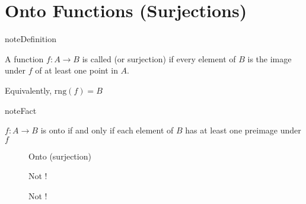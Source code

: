 \documentclass[letterpaper,10pt,english]{jupyterBook}
\begin{document}
\begin{figure}[htbp]
\centering

\noindent{}
\end{figure}


\section{Onto Functions (Surjections)}
\label{\detokenize{03.set_theory:onto-functions-surjections}}
\begin{sphinxadmonition}{note}{Definition}

\sphinxAtStartPar
A function \(f \colon A \to B\) is called  (or surjection) if every element of \(B\)
is the image under \(f\) of at least one point in \(A\).
\end{sphinxadmonition}

\sphinxAtStartPar
Equivalently, \(\mathrm{rng}(f) = B\)

\begin{figure}[htbp]
\centering

\noindent{}
\end{figure}

\begin{sphinxadmonition}{note}{Fact}

\sphinxAtStartPar
\(f \colon A \to B\) is onto if and only if each element of \(B\)
has at least one preimage under \(f\)
\end{sphinxadmonition}

\begin{figure}[htbp]
\centering
\capstart

\noindent{}
\caption{Onto (surjection)}\label{\detokenize{03.set_theory:bijection3}}\end{figure}

\begin{figure}[htbp]
\centering
\capstart

\noindent{}
\caption{Not !}\label{\detokenize{03.set_theory:function3}}\end{figure}

\begin{figure}[htbp]
\centering
\capstart

\noindent{}
\caption{Not !}\label{\detokenize{03.set_theory:bijection22}}\end{figure}
\end{document}
